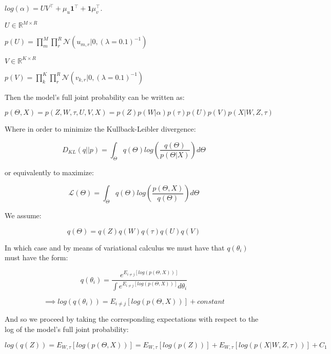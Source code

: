 \documentclass{article}
\begin{document}
\begin{description}
	\begin{description}
	\item$log(\alpha) = UV^\intercal + \mu_u \textbf{1}^\intercal + \textbf{1}\mu_v^\intercal$.
	\end{description}

\item $U \in \mathbb{R}^{M \times R}$
	\begin{description}
	\item $p(U) = \prod_m^M{\prod_r^R{\mathcal{N}(u_{m,r}|0, (\lambda=0.1)^{-1})}}$
	\end{description}
\item $V \in \mathbb{R}^{K \times R}$
	\begin{description}
	\item $p(V) = \prod_k^K{\prod_r^R{\mathcal{N}(v_{k,r}|0, (\lambda=0.1)^{-1})}}$
	\end{description}

\end{description}

\bigskip

Then the model's full joint probability can be written as:

$$p(\Theta,X) = p(Z,W,\tau,U,V,X) = p(Z)p(W|\alpha)p(\tau)p(U)p(V)p(X|W,Z,\tau)$$

Where in order to minimize the Kullback-Leibler divergence:

$$D_{KL}(q||p) = \int_\Theta{q(\Theta)log(\frac{q(\Theta)}{p(\Theta|X)})d\Theta}$$

or equivalently to maximize:

$$\mathcal{L}(\Theta) = \int_\Theta{q(\Theta)log(\frac{p(\Theta,X)}{q(\Theta)})d\Theta}$$

We assume:

$$q(\Theta) = q(Z)q(W)q(\tau)q(U)q(V)$$

In which case and by means of variational calculus we must have that $q(\theta_i)$ must have the form:

$$q(\theta_i) = \frac{e^{E_{i\neq j}[log(p(\Theta,X))]}}{\int{e^{E_{i\neq j}[log(p(\Theta,X))]}d\theta_i}}$$

$$\implies log(q(\theta_i)) = E_{i\neq j}[log(p(\Theta,X))] + constant$$

\bigskip

And so we proceed by taking the corresponding expectations with respect to the log of the model's full joint probability:

	
$$log(q(Z)) = E_{W,\tau}[log(p(\Theta,X))]  = E_{W,\tau}[log(p(Z))] + E_{W,\tau}[log(p(X|W,Z,\tau))] + C_1$$
\end{document}
